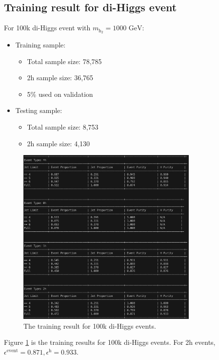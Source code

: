 \documentclass[12pt]{article}
\begin{document}
	\subsection{Training result for di-Higgs event}%
	\label{sub:training_result_for_dihiggs_event}
		For 100k di-Higgs event with $m_{\text{h}_2} = \text{1000 GeV}$:
		\begin{itemize}
			\item Training sample:
			\begin{itemize}
				\item Total sample size: 78,785
				\item 2h sample size: 36,765
				\item 5\% used on validation
			\end{itemize}
			\item Testing sample: 
				\begin{itemize}
					\item Total sample size: 8,753
					\item 2h sample size: 4,130
				\end{itemize}
		\end{itemize}
		\begin{figure}[htpb]
			\centering
			\includegraphics[width=0.8\textwidth]{100k_diHiggs.png}
			\caption{The training result for 100k di-Higgs events.}
			\label{fig:100k_diHiggs_result}
		\end{figure}
		Figure \ref{fig:100k_diHiggs_result} is the training results for 100k di-Higgs events. For 2h events, $\epsilon^{\text{event}} = 0.871, \epsilon^{\text{h}} = 0.933$.
\end{document}
